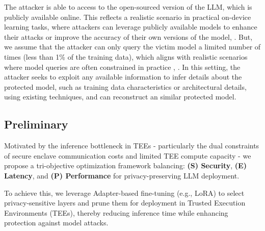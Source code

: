 \documentclass{article}
\begin{document}
The attacker is able to access to the open-sourced version of the LLM, which is publicly available online. This reflects a realistic scenario in practical on-device learning tasks, where attackers can leverage publicly available models to enhance their attacks or improve the accuracy of their own versions of the model\cite{chen2022teacher}, \cite{jiang2023empirical}. But, we assume that the attacker can only query the victim model a limited number of times (less than 1\% of the training data), which aligns with realistic scenarios where model queries are often constrained in practice \cite{rakin2022deepsteal}, \cite{oliynyk2023know}. In this setting, the attacker seeks to exploit any available information to infer details about the protected model, such as training data characteristics or architectural details, using existing techniques\cite{chen2022copy}, and can reconstruct an similar protected model. 

\subsection{Preliminary}
Motivated by the inference bottleneck in TEEs - particularly the dual constraints of secure enclave communication costs and limited TEE compute capacity - we propose a tri-objective optimization framework balancing:
\textbf{(S) Security}, \textbf{(E) Latency}, and \textbf{(P) Performance} for privacy-preserving LLM deployment.

To achieve this, we leverage Adapter-based fine-tuning (e.g., LoRA) to select privacy-sensitive layers and prune them for deployment in Trusted Execution Environments (TEEs), thereby reducing inference time while enhancing protection against model attacks.
\end{document}
